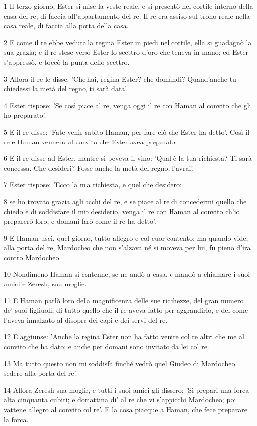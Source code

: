 \par 1 Il terzo giorno, Ester si mise la veste reale, e si presentò nel cortile interno della casa del re, di faccia all'appartamento del re. Il re era assiso sul trono reale nella casa reale, di faccia alla porta della casa.
\par 2 E come il re ebbe veduta la regina Ester in piedi nel cortile, ella si guadagnò la sua grazia; e il re stese verso Ester lo scettro d'oro che teneva in mano; ed Ester s'appressò, e toccò la punta dello scettro.
\par 3 Allora il re le disse: 'Che hai, regina Ester? che domandi? Quand'anche tu chiedessi la metà del regno, ti sarà data'.
\par 4 Ester rispose: 'Se così piace al re, venga oggi il re con Haman al convito che gli ho preparato'.
\par 5 E il re disse: 'Fate venir subito Haman, per fare ciò che Ester ha detto'. Così il re e Haman vennero al convito che Ester avea preparato.
\par 6 E il re disse ad Ester, mentre si beveva il vino: 'Qual è la tua richiesta? Ti sarà concessa. Che desideri? Fosse anche la metà del regno, l'avrai'.
\par 7 Ester rispose: 'Ecco la mia richiesta, e quel che desidero:
\par 8 se ho trovato grazia agli occhi del re, e se piace al re di concedermi quello che chiedo e di soddisfare il mio desiderio, venga il re con Haman al convito ch'io preparerò loro, e domani farò come il re ha detto'.
\par 9 E Haman uscì, quel giorno, tutto allegro e col cuor contento; ma quando vide, alla porta del re, Mardocheo che non s'alzava né si moveva per lui, fu pieno d'ira contro Mardocheo.
\par 10 Nondimeno Haman si contenne, se ne andò a casa, e mandò a chiamare i suoi amici e Zeresh, sua moglie.
\par 11 E Haman parlò loro della magnificenza delle sue ricchezze, del gran numero de' suoi figliuoli, di tutto quello che il re aveva fatto per aggrandirlo, e del come l'aveva innalzato al disopra dei capi e dei servi del re.
\par 12 E aggiunse: 'Anche la regina Ester non ha fatto venire col re altri che me al convito che ha dato; e anche per domani sono invitato da lei col re.
\par 13 Ma tutto questo non mi soddisfa finché vedrò quel Giudeo di Mardocheo sedere alla porta del re'.
\par 14 Allora Zeresh sua moglie, e tutti i suoi amici gli dissero: 'Si prepari una forca alta cinquanta cubiti; e domattina di' al re che vi s'appicchi Mardocheo; poi vattene allegro al convito col re'. E la cosa piacque a Haman, che fece preparare la forca.

